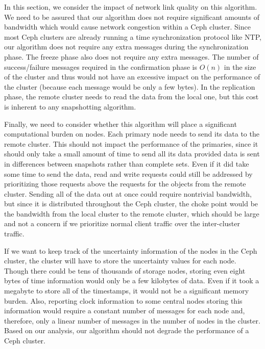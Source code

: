 In this section, we consider the impact of network link quality on 
this algorithm. We
need to be assured that our algorithm does not require significant
amounts of bandwidth which would cause network congestion within a
Ceph cluster. Since most Ceph clusters are already running a time
synchronization protocol like NTP, our algorithm does not require any
extra messages during the synchronization phase. The freeze phase also
does not require any extra messages. The number of success/failure
messages required in the confirmation phase is $O(n)$ in the size of
the cluster and thus would not have an excessive impact on the
performance of the cluster (because each message would be only a few
bytes). In the replication phase, the remote cluster needs to read
the data from the local one, but this cost is inherent to any
snapshotting algorithm.

Finally, we need to consider whether this algorithm will place a
significant computational burden on nodes. Each primary node needs to
send its data to the remote cluster. This should not impact the
performance of the primaries, since it should only take a small amount
of time to send all its data provided data is sent in differences
between snapshots rather than complete sets. Even if it did take some
time to send the data, read and write requests could still be
addressed by prioritizing those requests above the requests for the
objects from the remote cluster. Sending all of the data out at
once could require nontrivial bandwidth, but since it is distributed
throughout the Ceph cluster, the choke point would be the bandwidth
from the local cluster to the remote cluster, which should be large
and not a concern if we prioritize normal client traffic over the
inter-cluster traffic.

If we want to keep track of the uncertainty information of the nodes in
the Ceph cluster, the cluster will have to store the uncertainty values
for each node. Though there could be tens of
thousands of storage nodes, storing even eight bytes of time
information would only be a few kilobytes of data. Even if it
took a megabyte to store all of the timestamps, it would not be a
significant memory burden. Also, reporting clock information to some
central nodes storing this information
would require a constant number of messages for each node
and, therefore, only a linear number of messages in the number of
nodes in the cluster.  Based on our analysis, our algorithm should not
degrade the performance of a Ceph cluster.
